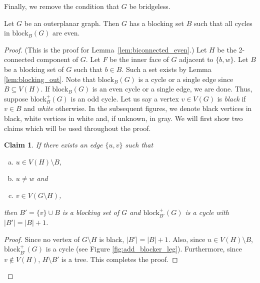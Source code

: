 \documentclass{patmorin}
\newcommand{\block}{\mathrm{block}}
\newtheorem{claim}{Claim}[theorem]
\begin{document}
Finally, we remove the condition that $G$ be bridgeless.

\begin{lem}
  Let $G$ be an outerplanar graph.  Then $G$ has a blocking set $B$ such 
that all cycles in $\block_B(G)$ are even.
\end{lem}


\begin{proof}
(This is the proof for Lemma~\ref{lem:biconnected_even}.) 
Let $H$ be the 2-connected component of $G$. Let $F$ be the inner face of $G$ adjacent to $\{b,w\}$. Let $B$ be a blocking set of $G$ such that $b \in B$. Such a set exists by Lemma \ref{lem:blocking_out}. Note that $\block_B(G)$ is a cycle or a single edge since $B \subseteq V(H)$. If $\block_B(G)$ is an even cycle or a single edge, we are done. Thus, suppose $\block_B^+(G)$ is an odd cycle. Let us say a vertex $v \in V(G)$ is \emph{black} if $v \in B$ and \emph{white} otherwise. In the subsequent figures, we denote black vertices in black,  white vertices in white and, if unknown, in gray. We will first show two claims which will be used throughout the proof.
 
\begin{claim}
 If there exists an edge $\{u,v\}$ such that 
 \begin{enumerate}[a)]
  \item $u \in V(H)\setminus B$, 
  \item $u\not=w$ and 
  \item $v \in V(G\setminus H)$,
 \end{enumerate}
 then $B'=\{v\}\cup B$ is a blocking set of $G$ and $\block_{B'}^+(G)$ is a cycle with $|B'| = |B| +1$.
 \label{claim:add_blocker_leg}
\end{claim}
\begin{proof}
 Since no vertex of $G\setminus H$ is black, $|B'| = |B| +1$. Also, since $u \in V(H)\setminus B$, $\block_{B'}^+(G)$ is a cycle (see Figure \ref{fig:add_blocker_leg}).  Furthermore, since $v\notin V(H)$, $H\setminus B'$ is a tree. This completes the proof.
\end{proof}

\begin{figure}[!ht]
  \centering
  
\end{figure}
\end{proof}
\end{document}
